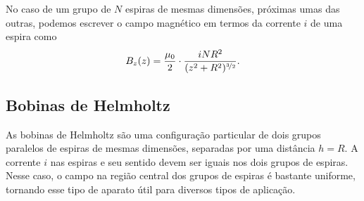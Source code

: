 No caso de um grupo de $N$ espiras de mesmas dimensões, próximas umas das outras, podemos escrever o campo magnético em termos da corrente $i$ de uma espira como
\begin{equation}\label{Eq:CampoMagneticoGrupoEspiras}
    B_z(z) = \frac{\mu_0}{2} \cdot \frac{iNR^2}{(z^2 + R^2)^{\nicefrac{3}{2}}}.
\end{equation}
    

\subsection{Bobinas de Helmholtz}

As bobinas de Helmholtz são uma configuração particular de dois grupos paralelos de espiras de mesmas dimensões, separadas por uma distância $h = R$. A corrente $i$ nas espiras e seu sentido  devem ser iguais nos dois grupos de espiras. Nesse caso, o campo na região central dos grupos de espiras é bastante uniforme, tornando esse tipo de aparato útil para diversos tipos de aplicação. 

